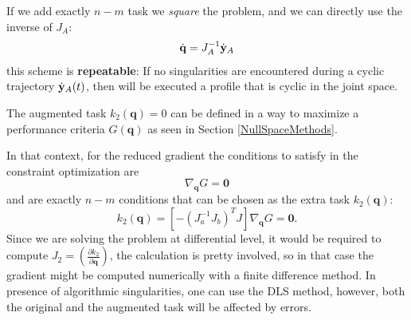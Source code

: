 \documentclass[10pt, a4paper]{report}
\begin{document}
\noindent   If we add exactly $n-m$ task we \textit{square} the problem, and we can directly use the inverse of $J_A$:\begin{equation}
    {\dot{\mathbf q}} = J_A^{-1}{\dot{\mathbf y}}_A 
\end{equation}
this scheme is \textbf{repeatable}: If no singularities are encountered during a cyclic trajectory ${\dot{\mathbf y}}_A(t)$, then will be executed a profile that is cyclic in the joint space.

The augmented task $k_2(\mathbf q)=0$ can be defined in a way to maximize a performance criteria $G(\mathbf q)$ as seen in Section \ref{NullSpaceMethods}.

In that context, for the reduced gradient the conditions to satisfy in the constraint optimization are\begin{equation}
    [-(J_a^{-1}J_b)^TJ]\nabla_{\mathbf q}G=\mathbf 0
\end{equation}
and are exactly $n-m$ conditions that can be chosen as the extra task $k_2(\mathbf q)$:
\begin{equation}
    k_2(\mathbf q)=[-(J_a^{-1}J_b)^TJ]\nabla_{\mathbf q}G=\mathbf 0.
\end{equation}
Since we are solving the problem at differential level, it would be required to compute $J_2=\left(\displaystyle\frac{\partial k_2}{\partial \mathbf q}\right)$, the calculation is pretty involved, so in that case the gradient might be computed numerically with a finite difference method.
In presence of algorithmic singularities, one can use the DLS method, however, both the original and the augmented task will be affected by errors.\bigskip 
\end{document}

